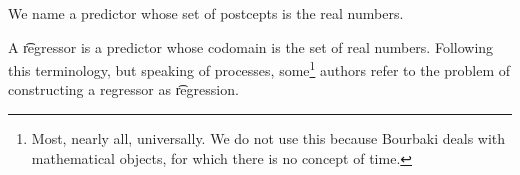 

We name a predictor whose set of postcepts is the real numbers.


A \t{regressor} is a predictor whose codomain is the set of real numbers.
Following this terminology, but speaking of processes, some\footnote{Most, nearly all, universally. We do not use this because Bourbaki deals with mathematical objects, for which there is no concept of time.} authors refer to the problem of constructing a regressor as \t{regression}.

\blankpage
